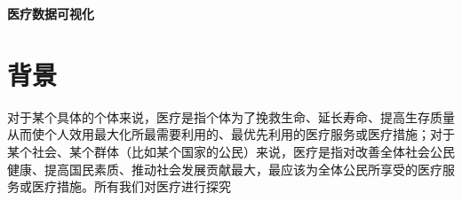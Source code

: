 \documentclass[12pt]{article}
\newcommand{\sanhao}{\fontsize{15.75pt}{\baselineskip}\selectfont}%
\newcommand{\xiaosanhao}{\fontsize{15pt}{\baselineskip}\selectfont}%
\begin{document}
\newpage
\thispagestyle{fancy}

\begin{center}
{\sanhao\textbf{医疗数据可视化}}
\end{center}

\renewcommand\abstractname{\xiaosanhao\textbf{摘~~~要}}

\begin{abstract}
\noindent\qquad 此次数据集是某地区的医疗数据，目的是为了分析医疗费用的花费情况，在不同的医院花费的金额。分析当代人民生病的主要病理，为此地的医疗建设和群众的就医情况做一个数据分析。为此做关于医疗费用的数据可视化，增加可读性。

\noindent\qquad 此次主要使用的是python软件，版本为python3.9.11和jupyter，还有数据可视化工具Tableau Public 2022.2。来进行数据分析。

\noindent\qquad 数据可视化的意义是帮助人更好的分析数据，信息的质量很大程度上依赖于其表达方式。总结如下，在花费的费用方面，无论是一级医院还是社区医院，所花费的金额都是一样的。主动脉弓狭窄是最严重的问题，也是花费金额最多的疾病。社区医院就医占多数，其他的也都差不多。主要的医护人员处于中年。发病率最高的是糖尿病。

\noindent\textbf{关键词：} \quad python \quad pyecharts\quad 医疗  \quad Tableau
\end{abstract}




\newpage

\thispagestyle{fancy}

\vspace*{1mm}%


\renewcommand\contentsname{\xiaosanhao\textbf{目~~~录}}


\tableofcontents

\newpage%

\pagestyle{plain}


\section{背景}
\noindent\qquad 对于某个具体的个体来说，医疗是指个体为了挽救生命、延长寿命、提高生存质量从而使个人效用最大化所最需要利用的、最优先利用的医疗服务或医疗措施；对于某个社会、某个群体（比如某个国家的公民）来说，医疗是指对改善全体社会公民健康、提高国民素质、推动社会发展贡献最大，最应该为全体公民所享受的医疗服务或医疗措施。所有我们对医疗进行探究
\end{document}
